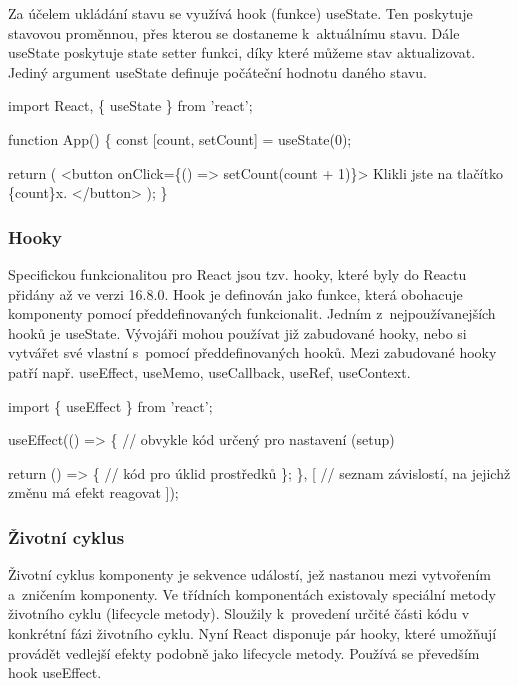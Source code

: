 Za účelem ukládání stavu se využívá hook (funkce) useState. Ten poskytuje stavovou proměnnou, přes kterou se dostaneme k~aktuálnímu stavu. 
Dále useState poskytuje state setter funkci, díky které můžeme stav aktualizovat. Jediný argument useState definuje počáteční hodnotu daného stavu.\cite{reactitnetwork,react}

\begin{prog}
import React, \{ useState \} from 'react';

function App() \{
  const [count, setCount] = useState(0);

  return (
    <button onClick=\{() => setCount(count + 1)\}>
      Klikli jste na tlačítko \{count\}x.
    </button>
  );
\}
\end{prog}

\subsubsection{Hooky}

Specifickou funkcionalitou pro React jsou tzv. hooky, které byly do Reactu přidány až ve verzi 16.8.0.\cite{reactgithub} 
Hook je definován jako funkce, která obohacuje komponenty pomocí předdefinovaných funkcionalit. Jedním z~nejpoužívanejších hooků je useState. 
Vývojáři mohou používat již zabudované hooky, nebo si vytvářet své vlastní s~pomocí předdefinovaných hooků. 
Mezi zabudované hooky patří např. useEffect, useMemo, useCallback, useRef, useContext.\cite{react}

\begin{prog}
import \{ useEffect \} from 'react';

useEffect(() => \{
  // obvykle kód určený pro nastavení (setup)

  return () => \{
    // kód pro úklid prostředků
  \};
\}, [
  // seznam závislostí, na jejichž změnu má efekt reagovat
]);
\end{prog}

\subsubsection{Životní cyklus}

Životní cyklus komponenty je sekvence událostí, jež nastanou mezi vytvořením a~zničením komponenty. 
Ve třídních komponentách existovaly speciální metody životního cyklu (lifecycle metody). Sloužily k~provedení určité části kódu v konkrétní fázi životního cyklu.  
Nyní React disponuje pár hooky, které umožňují provádět vedlejší efekty podobně jako lifecycle metody. Používá se převedším hook useEffect.

